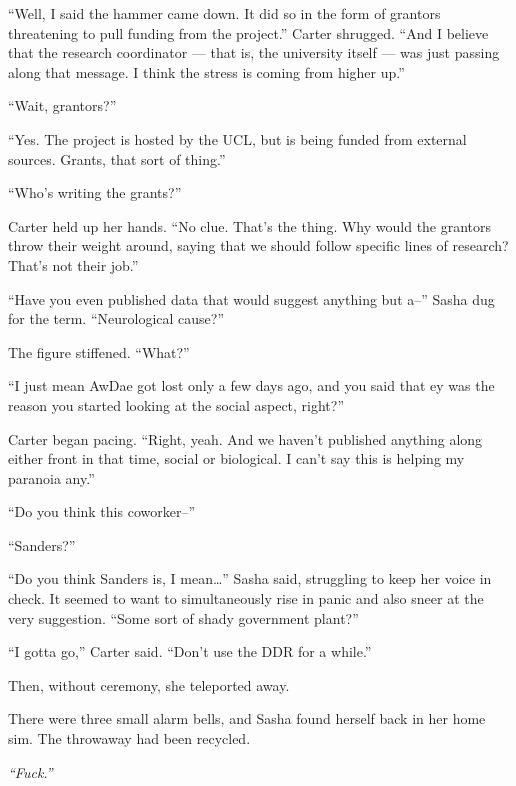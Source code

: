 ``Well, I said the hammer came down. It did so in the form of grantors threatening to pull funding from the project.'' Carter shrugged. ``And I believe that the research coordinator — that is, the university itself — was just passing along that message. I think the stress is coming from higher up.''

``Wait, grantors?''

``Yes. The project is hosted by the UCL, but is being funded from external sources. Grants, that sort of thing.''

``Who's writing the grants?''

Carter held up her hands. ``No clue. That's the thing. Why would the grantors throw their weight around, saying that we should follow specific lines of research? That's not their job.''

``Have you even published data that would suggest anything but a--'' Sasha dug for the term. ``Neurological cause?''

The figure stiffened. ``What?''

``I just mean AwDae got lost only a few days ago, and you said that ey was the reason you started looking at the social aspect, right?''

Carter began pacing. ``Right, yeah. And we haven't published anything along either front in that time, social or biological. I can't say this is helping my paranoia any.''

``Do you think this coworker--''

``Sanders?''

``Do you think Sanders is, I mean\ldots{}'' Sasha said, struggling to keep her voice in check. It seemed to want to simultaneously rise in panic and also sneer at the very suggestion. ``Some sort of shady government plant?''

``I gotta go,'' Carter said. ``Don't use the DDR for a while.''

Then, without ceremony, she teleported away.

There were three small alarm bells, and Sasha found herself back in her home sim. The throwaway had been recycled.

\emph{``Fuck.''}
